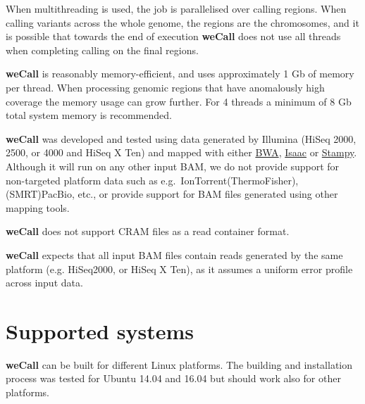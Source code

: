\documentclass{article}
\newcommand{\wecallproduct}{\textbf{weCall}}
\begin{document}
When multithreading is used, the job is parallelised over calling regions.  When calling variants across
the whole genome, the regions are the chromosomes, and it is possible that towards the end of execution {\wecallproduct} does not use all threads
when completing calling on the final regions.

\textbf{{\wecallproduct}} is reasonably memory-efficient, and uses approximately 1 Gb of memory per thread.  When processing genomic regions that
have anomalously high coverage the memory usage can grow further.  For 4 threads a minimum of 8 Gb total system memory is recommended.


{\wecallproduct} was developed and tested using data generated by Illumina (HiSeq  2000, 2500, or 4000 and HiSeq X Ten) and mapped with either \href{http://bio-bwa.sourceforge.net/}{BWA},  \href{https://github.com/sequencing/isaac_aligner}{Isaac} or \href{http://www.well.ox.ac.uk/stampy}{Stampy}.
Although it will run on any other input BAM, we do not provide support for non-targeted platform data such as e.g.\ IonTorrent(ThermoFisher),
(SMRT)PacBio, etc., or provide support for BAM files generated using other mapping tools.

{\wecallproduct} does not support CRAM files as a read container format.

{\wecallproduct} expects that all input BAM files contain reads generated by the same platform (e.g. HiSeq2000, or HiSeq X Ten), as it assumes a
uniform error profile across input data.

\section{Supported systems}

\textbf{{\wecallproduct}} can be built for different Linux platforms.
The building and installation process was tested for Ubuntu 14.04 and 16.04 but should work also for other platforms.
\end{document}
